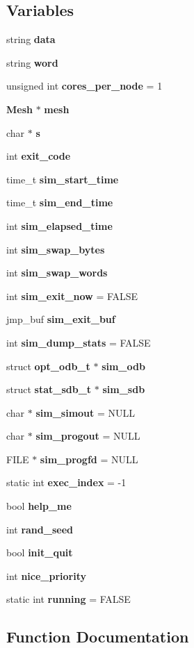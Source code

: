\subsection*{Variables}
\begin{CompactItemize}
\item 
string {\bf data}
\item 
string {\bf word}
\item 
unsigned int {\bf cores\_\-per\_\-node} = 1
\item 
{\bf Mesh} $\ast$ {\bf mesh}
\item 
char $\ast$ {\bf s}
\item 
int {\bf exit\_\-code}
\item 
time\_\-t {\bf sim\_\-start\_\-time}
\item 
time\_\-t {\bf sim\_\-end\_\-time}
\item 
int {\bf sim\_\-elapsed\_\-time}
\item 
int {\bf sim\_\-swap\_\-bytes}
\item 
int {\bf sim\_\-swap\_\-words}
\item 
int {\bf sim\_\-exit\_\-now} = FALSE
\item 
jmp\_\-buf {\bf sim\_\-exit\_\-buf}
\item 
int {\bf sim\_\-dump\_\-stats} = FALSE
\item 
struct {\bf opt\_\-odb\_\-t} $\ast$ {\bf sim\_\-odb}
\item 
struct {\bf stat\_\-sdb\_\-t} $\ast$ {\bf sim\_\-sdb}
\item 
char $\ast$ {\bf sim\_\-simout} = NULL
\item 
char $\ast$ {\bf sim\_\-progout} = NULL
\item 
FILE $\ast$ {\bf sim\_\-progfd} = NULL
\item 
static int {\bf exec\_\-index} = -1
\item 
bool {\bf help\_\-me}
\item 
int {\bf rand\_\-seed}
\item 
bool {\bf init\_\-quit}
\item 
int {\bf nice\_\-priority}
\item 
static int {\bf running} = FALSE
\end{CompactItemize}


\subsection{Function Documentation}
